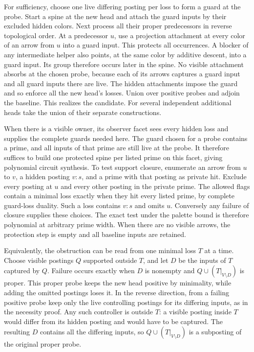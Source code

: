 For sufficiency, choose one live differing
posting per loss to form a guard at the
probe. Start a spine at the new head and attach
the guard inputs by their excluded hidden
colors. Next process all their proper
predecessors in reverse topological order.
At a predecessor $u$, use a projection
attachment at every color of an arrow
from $u$ into a guard input. This protects
all occurrences. A blocker of any
intermediate helper also points, at the
same color by additive descent, into a
guard input. Its group therefore occurs
later in the spine. No visible attachment
absorbs at the chosen probe, because each
of its arrows captures a guard input and
all guard inputs there are live. The hidden
attachments impose the guard and so enforce
all the new head's losses. Union over
positive probes and adjoin the baseline.
This realizes the candidate. For several
independent additional heads take the union
of their separate constructions.

When there is a visible owner, its observer
facet sees every hidden loss and supplies the
complete guards needed here. The guard chosen
for a probe contains a prime, and all inputs
of that prime are still live at the probe.
It therefore suffices to build one protected
spine per listed prime on this facet, giving
polynomial circuit synthesis. To test support
closure, enumerate an arrow from $u$ to $v$,
a hidden posting $v:s$, and a prime with
that posting as private hit. Exclude every
posting at $u$ and every other posting in
the private prime. The allowed flags
contain a minimal loss exactly when they hit
every listed prime, by complete guard-loss
duality. Such a loss contains $v:s$ and omits
$u$. Conversely any failure of closure supplies
these choices. The exact test under the
palette bound is therefore polynomial at
arbitrary prime width. When there are no
visible arrows, the protection step is empty
and all baseline inputs are retained.

Equivalently, the obstruction can be read from
one minimal loss $T$ at a time. Choose visible
postings $Q$ supported outside $T$, and let
$D$ be the inputs of $T$ captured by $Q$.
Failure occurs exactly when $D$ is nonempty
and $Q\cup(T|_{V\setminus D})$ is proper.
This proper probe keeps the new head positive
by minimality, while adding the omitted
postings loses it. In the reverse direction,
from a failing positive probe keep only the
live controlling postings for its differing
inputs, as in the necessity proof. Any such
controller is outside $T$: a visible posting
inside $T$ would differ from its hidden posting
and would have to be captured. The resulting
$D$ contains all the differing inputs, so
$Q\cup(T|_{V\setminus D})$ is a subposting of
the original proper probe.

